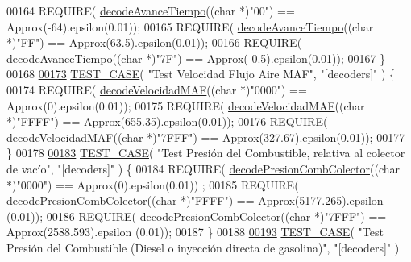 \begin{DoxyCode}
{00164     REQUIRE( \hyperlink{decoders_8cpp_a7a2fee87eace8ad6c86c628f5f91b3b5}{decodeAvanceTiempo}((\textcolor{keywordtype}{char} *)\textcolor{stringliteral}{"00"}) == Approx(-64).epsilon(0.01));
00165     REQUIRE( \hyperlink{decoders_8cpp_a7a2fee87eace8ad6c86c628f5f91b3b5}{decodeAvanceTiempo}((\textcolor{keywordtype}{char} *)\textcolor{stringliteral}{"FF"}) == Approx(63.5).epsilon(0.01));
00166     REQUIRE( \hyperlink{decoders_8cpp_a7a2fee87eace8ad6c86c628f5f91b3b5}{decodeAvanceTiempo}((\textcolor{keywordtype}{char} *)\textcolor{stringliteral}{"7F"}) == Approx(-0.5).epsilon(0.01));
00167 \}
00168 
\hyperlink{UnitTestCase_8cpp_af5a76ba4da5f3b2cafb3b5366118dbcd}{00173} \hyperlink{UnitTestCase_8cpp_a094ceea8956a9b495823bde621ea759a}{TEST\_CASE}( \textcolor{stringliteral}{"Test Velocidad Flujo Aire MAF"}, \textcolor{stringliteral}{"[decoders]"} ) \{
00174     REQUIRE( \hyperlink{decoders_8cpp_adceefeb78a70b295b378f4c472630aa1}{decodeVelocidadMAF}((\textcolor{keywordtype}{char} *)\textcolor{stringliteral}{"0000"}) == Approx(0).epsilon(0.01));
00175     REQUIRE( \hyperlink{decoders_8cpp_adceefeb78a70b295b378f4c472630aa1}{decodeVelocidadMAF}((\textcolor{keywordtype}{char} *)\textcolor{stringliteral}{"FFFF"}) == Approx(655.35).epsilon(0.01));
00176     REQUIRE( \hyperlink{decoders_8cpp_adceefeb78a70b295b378f4c472630aa1}{decodeVelocidadMAF}((\textcolor{keywordtype}{char} *)\textcolor{stringliteral}{"7FFF"}) == Approx(327.67).epsilon(0.01));
00177 \}
00178 
\hyperlink{UnitTestCase_8cpp_af9cb80dc5e3813608e63479be181d3d7}{00183} \hyperlink{UnitTestCase_8cpp_a094ceea8956a9b495823bde621ea759a}{TEST\_CASE}( \textcolor{stringliteral}{"Test Presión del Combustible, relativa al colector de vacío"}, \textcolor{stringliteral}{"[decoders]"} ) \{
00184     REQUIRE( \hyperlink{decoders_8cpp_a3e32aaf8ced989570e141f01210564f3}{decodePresionCombColector}((\textcolor{keywordtype}{char} *)\textcolor{stringliteral}{"0000"}) == Approx(0).epsilon(0.01))
      ;
00185     REQUIRE( \hyperlink{decoders_8cpp_a3e32aaf8ced989570e141f01210564f3}{decodePresionCombColector}((\textcolor{keywordtype}{char} *)\textcolor{stringliteral}{"FFFF"}) == Approx(5177.265).epsilon
      (0.01));
00186     REQUIRE( \hyperlink{decoders_8cpp_a3e32aaf8ced989570e141f01210564f3}{decodePresionCombColector}((\textcolor{keywordtype}{char} *)\textcolor{stringliteral}{"7FFF"}) == Approx(2588.593).epsilon
      (0.01));
00187 \}
00188 
\hyperlink{UnitTestCase_8cpp_a578a25cbf0eb039b82b3f9c2c9934672}{00193} \hyperlink{UnitTestCase_8cpp_a094ceea8956a9b495823bde621ea759a}{TEST\_CASE}( \textcolor{stringliteral}{"Test Presión del Combustible (Diesel o inyección directa de gasolina)"}, \textcolor{stringliteral}{"[decoders]"} )
}
\end{DoxyCode}
